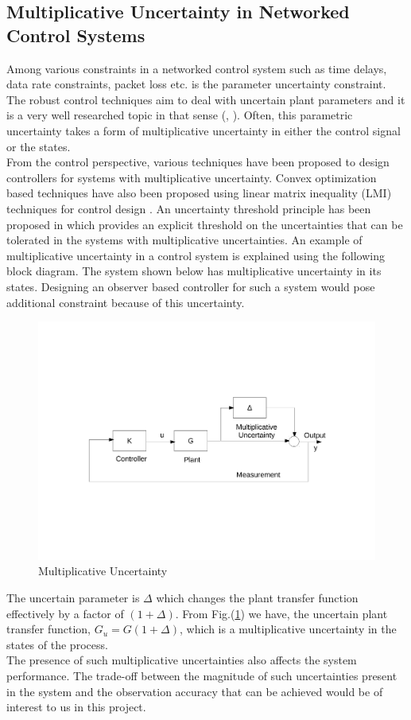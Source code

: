 \documentclass[a4paper,12pt]{article}
\begin{document}
	\subsection{Multiplicative Uncertainty in Networked Control Systems}
	Among various constraints in a networked control system such as time delays, data rate constraints, packet loss etc. is the parameter uncertainty constraint. The robust control techniques aim to deal with uncertain plant parameters and it is a very well researched topic in that sense (\cite{robust1}, \cite{robust2}). Often, this parametric uncertainty takes a form of multiplicative uncertainty in either the control signal or the states.  \\
	From the control perspective, various techniques have been proposed to design controllers for systems with multiplicative uncertainty. Convex optimization based techniques have also been proposed using linear matrix inequality (LMI) techniques for control design \cite{lmi}. An uncertainty threshold principle has been proposed in \cite{uncthres} which provides an explicit threshold on the uncertainties that can be tolerated in the systems with multiplicative uncertainties. An example of multiplicative uncertainty in a control system is explained using the following block diagram. The system shown below has multiplicative uncertainty in its states. Designing an observer based controller for such a system would pose additional constraint because of this uncertainty.
		\begin{figure}[H]

			  \centering
%			  
			\includegraphics[scale=0.5]{mult}
			  \caption{Multiplicative Uncertainty}
			 \label{mult}
		\end{figure}	
		The uncertain parameter is $\Delta$ which changes the plant transfer function effectively by a factor of $(1+\Delta)$. From Fig.(\ref{mult}) we have, the uncertain plant transfer function, $G_{u}=G(1+\Delta)$, which is a multiplicative uncertainty in the states of the process.\\
		The presence of such multiplicative uncertainties also affects the system performance. The trade-off between the magnitude of such uncertainties present in the system and the observation accuracy that can be achieved would be of interest to us in this project.
\end{document}
